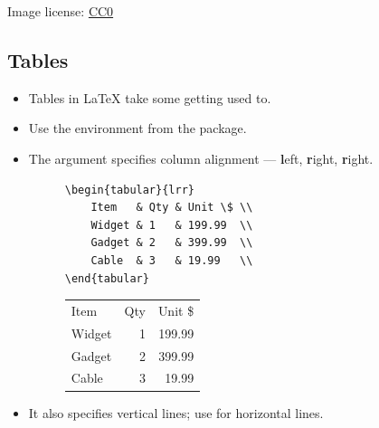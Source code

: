 \documentclass[aspectratio=169]{beamer}
\begin{document}
\begin{frame}{\insertsubsection}
\tiny{Image license: \href{https://pixabay.com/en/animal-apple-attractive-beautiful-1239390/}{CC0}}
\end{frame}

\subsection{Tables}
\begin{frame}[fragile]{\insertsubsection}
\begin{itemize}
\item Tables in \LaTeX{} take some getting used to.
\item Use the  environment from the  package.
\item The argument specifies column alignment --- \textbf{l}eft, \textbf{r}ight, \textbf{r}ight.
\begin{figure}
    \begin{minipage}{0.5\textwidth}
        \begin{lstlisting}
\begin{tabular}{lrr}
    Item   & Qty & Unit \$ \\
    Widget & 1   & 199.99  \\
    Gadget & 2   & 399.99  \\
    Cable  & 3   & 19.99   \\
\end{tabular}
        \end{lstlisting}
    \end{minipage}
    \begin{minipage}{0.4\textwidth}
        \begin{tabular}{lrr}
        Item   & Qty & Unit \$ \\
        Widget & 1   & 199.99  \\
        Gadget & 2   & 399.99  \\
        Cable  & 3   & 19.99   \\
        \end{tabular}
    \end{minipage}
\end{figure}
\item It also specifies vertical lines; use  for horizontal lines.
\begin{figure}

\end{figure}
\end{itemize}
\end{frame}
\end{document}
